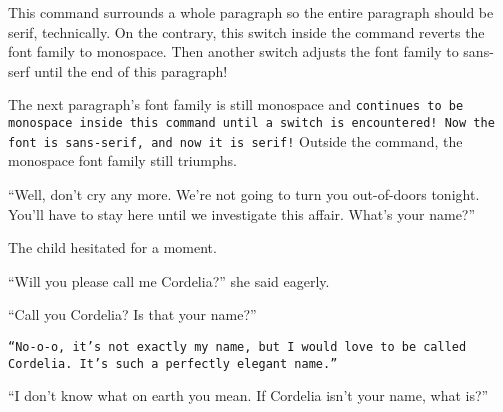 \documentclass[a4paper]{article}
\begin{document}
\textrm{This command surrounds a whole paragraph so the entire paragraph should be serif, technically. On the contrary, \ttfamily this switch inside the command reverts the font family to monospace. Then \sffamily another switch adjusts the font family to sans-serf until the end of this paragraph!}

The next paragraph's font family is still monospace and \texttt{continues to be monospace inside this command \sffamily until a switch is encountered! Now the font is sans-serif, \rmfamily and now it is serif!} Outside the command, the monospace font family still triumphs.

``Well, don't cry any more. \textsf{We're not going to turn you out-of-doors tonight. \rmfamily You'll have to stay here until we investigate this affair.} What's your name?''

\textrm{The child hesitated \ttfamily for a moment.}

\textrm{``Will you please call me Cordelia?'' \sffamily she said eagerly.}

``Call you Cordelia? Is that your name?''

\texttt{``No-o-o, it's not exactly my name, \sffamily but I would love to be called Cordelia. \rmfamily It's such a perfectly elegant name.''}

``I don't know what on earth you mean. If Cordelia isn't your name, what is?''
\end{document}

